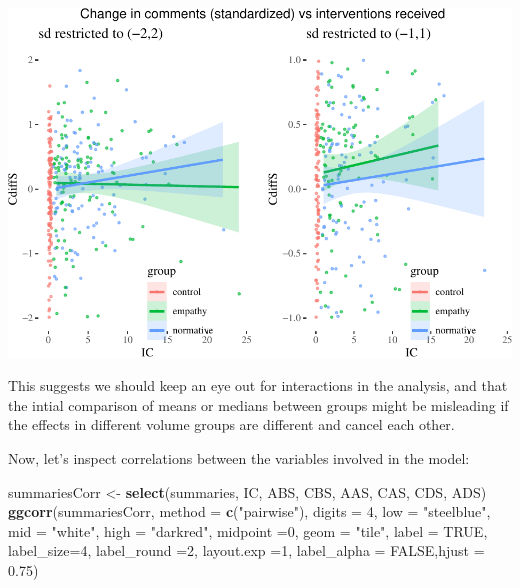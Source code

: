 \documentclass[10pt,dvipsnames,enabledeprecatedfontcommands]{scrartcl}
\newenvironment{Shaded}{\begin{snugshade}}{\end{snugshade}}
\newcommand{\KeywordTok}[1]{\textcolor[rgb]{0.13,0.29,0.53}{\textbf{#1}}}
\newcommand{\DataTypeTok}[1]{\textcolor[rgb]{0.13,0.29,0.53}{#1}}
\newcommand{\DecValTok}[1]{\textcolor[rgb]{0.00,0.00,0.81}{#1}}
\newcommand{\FloatTok}[1]{\textcolor[rgb]{0.00,0.00,0.81}{#1}}
\newcommand{\StringTok}[1]{\textcolor[rgb]{0.31,0.60,0.02}{#1}}
\newcommand{\OtherTok}[1]{\textcolor[rgb]{0.56,0.35,0.01}{#1}}
\newcommand{\NormalTok}[1]{#1}
\begin{document}
\begin{center}\includegraphics[width=1\linewidth]{bayesianReport_files/figure-latex/icc-1} \end{center}

\normalsize

This suggests we should keep an eye out for interactions in the
analysis, and that the intial comparison of means or medians between
groups might be misleading if the effects in different volume groups are
different and cancel each other.

Now, let's inspect correlations between the variables involved in the
model:

\vspace{1mm} \footnotesize

\begin{Shaded}
\begin{Highlighting}[]
\NormalTok{summariesCorr <-}\StringTok{ }\KeywordTok{select}\NormalTok{(summaries, IC, ABS, CBS, AAS, CAS, CDS, ADS)}
\KeywordTok{ggcorr}\NormalTok{(summariesCorr, }\DataTypeTok{method =} \KeywordTok{c}\NormalTok{(}\StringTok{"pairwise"}\NormalTok{),}
       \DataTypeTok{digits =} \DecValTok{4}\NormalTok{, }\DataTypeTok{low =} \StringTok{"steelblue"}\NormalTok{, }\DataTypeTok{mid =} \StringTok{"white"}\NormalTok{,}
       \DataTypeTok{high =} \StringTok{"darkred"}\NormalTok{, }\DataTypeTok{midpoint =}\DecValTok{0}\NormalTok{,}
       \DataTypeTok{geom =} \StringTok{"tile"}\NormalTok{, }\DataTypeTok{label =} \OtherTok{TRUE}\NormalTok{, }\DataTypeTok{label_size=}\DecValTok{4}\NormalTok{, }\DataTypeTok{label_round =}\DecValTok{2}\NormalTok{, }\DataTypeTok{layout.exp =}\DecValTok{1}\NormalTok{,}
       \DataTypeTok{label_alpha =} \OtherTok{FALSE}\NormalTok{,}\DataTypeTok{hjust =} \FloatTok{0.75}\NormalTok{)}
\end{Highlighting}
\end{Shaded}
\end{document}
